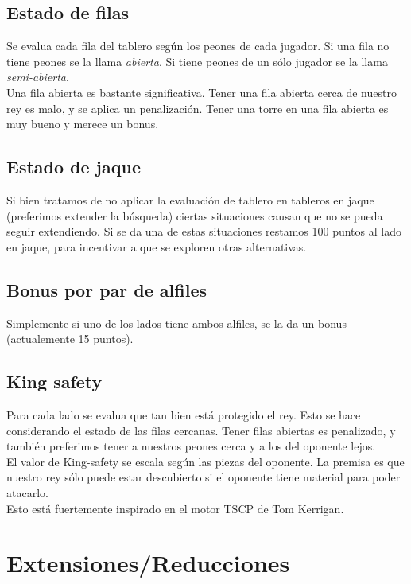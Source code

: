 \documentclass{article}
\begin{document}
\subsection{Estado de filas}
Se evalua cada fila del tablero según los peones de cada jugador. Si una fila no tiene peones se la llama \emph{abierta}. Si tiene peones de un sólo jugador se la llama \emph{semi-abierta}.
\\

Una fila abierta es bastante significativa. Tener una fila abierta cerca
de nuestro rey es malo, y se aplica un penalización. Tener una torre en
una fila abierta es muy bueno y merece un bonus.

\subsection{Estado de jaque}
Si bien tratamos de no aplicar la evaluación de tablero en tableros
en jaque (preferimos extender la búsqueda) ciertas situaciones causan
que no se pueda seguir extendiendo. Si se da una de estas situaciones
restamos 100 puntos al lado en jaque, para incentivar a que se exploren
otras alternativas.

\subsection{Bonus por par de alfiles}
Simplemente si uno de los lados tiene ambos alfiles, se la da un bonus
(actualemente 15 puntos).

\subsection{King safety}
Para cada lado se evalua que tan bien está protegido el rey. Esto se
hace considerando el estado de las filas cercanas. Tener filas abiertas
es penalizado, y también preferimos tener a nuestros peones cerca y a
los del oponente lejos.
\\

El valor de King-safety se escala según las piezas del oponente. La
premisa es que nuestro rey sólo puede estar descubierto si el oponente
tiene material para poder atacarlo.
\\

Esto está fuertemente inspirado en el motor TSCP de Tom Kerrigan.

\section{Extensiones/Reducciones}
\end{document}
